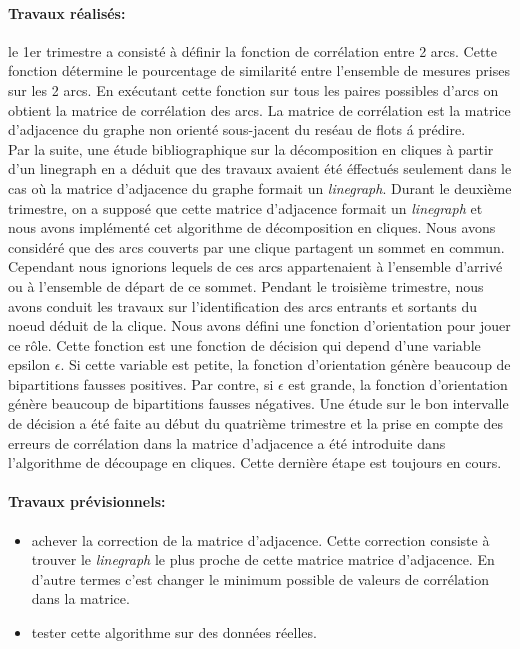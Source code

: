 \documentclass [a4paper,10pt]{article}
\begin{document}
		\paragraph{Travaux r\'ealis\'es: }
		le 1er trimestre a consist\'e \`a d\'efinir la fonction de corr\'elation entre 2 arcs. Cette fonction d\'etermine le pourcentage de similarit\'e entre l'ensemble de mesures  prises sur les 2 arcs. En ex\'ecutant cette fonction sur tous les paires possibles d'arcs on obtient la matrice de corr\'elation des arcs. La matrice de corr\'elation est la matrice d'adjacence du graphe non orient\'e sous-jacent du res\'eau de flots \'a pr\'edire. \\
		Par la suite, une \'etude bibliographique sur la d\'ecomposition en cliques \`a partir d'un linegraph en a d\'eduit que des travaux avaient \'et\'e \'effectu\'es seulement dans le cas o\`u la matrice d'adjacence du graphe formait un \textit{linegraph}. Durant le deuxi\`eme trimestre, on a suppos\'e que cette matrice d'adjacence formait un \textit{linegraph} et nous avons impl\'ement\'e cet algorithme de d\'ecomposition en cliques. Nous avons consid\'er\'e que des arcs couverts par une clique partagent un sommet en commun. Cependant nous ignorions lequels de ces arcs appartenaient \`a l'ensemble  d'arriv\'e ou \`a l'ensemble de d\'epart de ce sommet. \newline
		 Pendant le troisi\`eme trimestre, nous avons conduit les travaux sur l'identification des arcs entrants et sortants du noeud d\'eduit de la clique. Nous avons d\'efini une fonction d'orientation pour jouer ce r\^ole. Cette fonction est une fonction de d\'ecision qui depend  d'une variable epsilon $\epsilon$. Si cette variable est petite, la fonction d'orientation g\'en\`ere beaucoup de bipartitions fausses positives. Par contre, si $\epsilon$ est grande, la fonction d'orientation g\'en\`ere beaucoup de bipartitions fausses n\'egatives. \newline
		 Une \'etude sur le bon intervalle de d\'ecision a \'et\'e faite au d\'ebut du quatri\`eme trimestre et la prise en compte des erreurs de corr\'elation dans la matrice d'adjacence a \'et\'e introduite dans l'algorithme de d\'ecoupage en cliques. Cette derni\`ere \'etape est toujours en cours.   
		
	\paragraph{Travaux pr\'evisionnels: }
	\begin{itemize}
		\item achever la correction de la matrice d'adjacence. Cette correction consiste \`a trouver le \textit{linegraph} le plus proche de cette matrice matrice  d'adjacence. En d'autre termes c'est changer le minimum possible de valeurs de corr\'elation dans la matrice.
		\item tester cette algorithme sur des donn\'ees r\'eelles.
	\end{itemize}	
	
\end{document}
